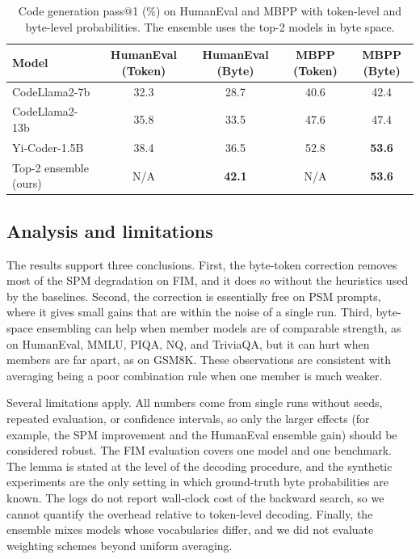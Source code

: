 \documentclass{article} %
\begin{document}
\begin{table}[t]
\caption{Code generation pass@1 (\%) on HumanEval and MBPP with token-level and byte-level probabilities. The ensemble uses the top-2 models in byte space.}
\label{tab:code}
\begin{center}
\begin{tabular}{lcccc}
\toprule
Model & HumanEval (Token) & HumanEval (Byte) & MBPP (Token) & MBPP (Byte) \\
\midrule
CodeLlama2-7b & 32.3 & 28.7 & 40.6 & 42.4 \\
CodeLlama2-13b & 35.8 & 33.5 & 47.6 & 47.4 \\
Yi-Coder-1.5B & 38.4 & 36.5 & 52.8 & \textbf{53.6} \\
Top-2 ensemble (ours) & N/A & \textbf{42.1} & N/A & \textbf{53.6} \\
\bottomrule
\end{tabular}
\end{center}
\end{table}

\subsection{Analysis and limitations}
The results support three conclusions. First, the byte-token correction removes most of the SPM degradation on FIM, and it does so without the heuristics used by the baselines. Second, the correction is essentially free on PSM prompts, where it gives small gains that are within the noise of a single run. Third, byte-space ensembling can help when member models are of comparable strength, as on HumanEval, MMLU, PIQA, NQ, and TriviaQA, but it can hurt when members are far apart, as on GSM8K. These observations are consistent with averaging being a poor combination rule when one member is much weaker.

Several limitations apply. All numbers come from single runs without seeds, repeated evaluation, or confidence intervals, so only the larger effects (for example, the SPM improvement and the HumanEval ensemble gain) should be considered robust. The FIM evaluation covers one model and one benchmark. The lemma is stated at the level of the decoding procedure, and the synthetic experiments are the only setting in which ground-truth byte probabilities are known. The logs do not report wall-clock cost of the backward search, so we cannot quantify the overhead relative to token-level decoding. Finally, the ensemble mixes models whose vocabularies differ, and we did not evaluate weighting schemes beyond uniform averaging.
\end{document}
